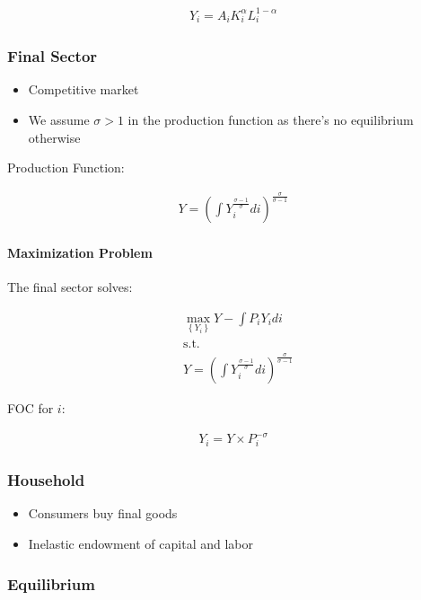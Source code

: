\documentclass[10pt]{article}
\begin{document}
\begin{align}
    Y_i=A_i K_i^\alpha L_i^{1-\alpha}
\end{align}

\subsubsection{Final Sector}

\begin{itemize}
    \item Competitive market 
    \item We assume $\sigma > 1$ in the production function as there's no equilibrium otherwise 
\end{itemize}

Production Function:

\begin{align}
    Y=\left(\int Y_i^{\frac{\sigma-1}{\sigma}} d i\right)^{\frac{\sigma}{\sigma-1}}
\end{align}

\paragraph{Maximization Problem}

The final sector solves:

\begin{align}
    &\max _{\left\{Y_i\right\}} Y-\int P_i Y_i d i\\
    &\text{s.t.}\\
    &Y=\left(\int Y_i^{\frac{\sigma-1}{\sigma}} d i\right)^{\frac{\sigma}{\sigma-1}}
\end{align}

FOC for $i$:

\begin{align}
    Y_i=Y \times P_i^{-\sigma}
\end{align}

\subsubsection{Household}

\begin{itemize}
    \item Consumers buy final goods
    \item Inelastic endowment of capital and labor
\end{itemize}

\subsubsection{Equilibrium}
\end{document}

